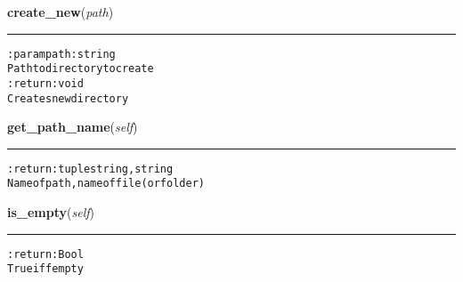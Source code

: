 \hspace{.8\funcindent}\begin{boxedminipage}{\funcwidth}

    \raggedright \textbf{create\_new}(\textit{path})

    \vspace{-1.5ex}

    \rule{\textwidth}{0.5\fboxrule}
\setlength{\parskip}{2ex}
\begin{alltt}

:param path: string
    Path to directory to create
:return: void
    Creates new directory
\end{alltt}

\setlength{\parskip}{1ex}
    \end{boxedminipage}

    \label{hal:files:models:Directory:get_path_name}

    \vspace{0.5ex}

\hspace{.8\funcindent}\begin{boxedminipage}{\funcwidth}

    \raggedright \textbf{get\_path\_name}(\textit{self})

    \vspace{-1.5ex}

    \rule{\textwidth}{0.5\fboxrule}
\setlength{\parskip}{2ex}
\begin{alltt}

:return: tuple string, string
    Name of path, name of file (or folder)
\end{alltt}

\setlength{\parskip}{1ex}
    \end{boxedminipage}

    \label{hal:files:models:Directory:is_empty}

    \vspace{0.5ex}

\hspace{.8\funcindent}\begin{boxedminipage}{\funcwidth}

    \raggedright \textbf{is\_empty}(\textit{self})

    \vspace{-1.5ex}

    \rule{\textwidth}{0.5\fboxrule}
\setlength{\parskip}{2ex}
\begin{alltt}

:return: Bool
    True iff empty
\end{alltt}

\setlength{\parskip}{1ex}
    \end{boxedminipage}



